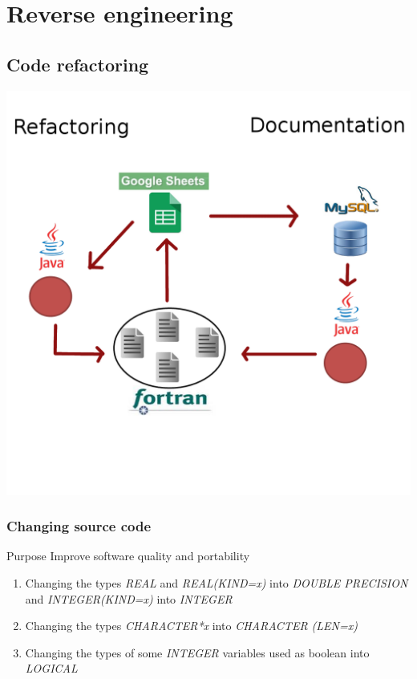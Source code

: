 \documentclass[10p]{beamer}
\begin{document}
\section{Reverse engineering}
\subsection{Code refactoring}
\begin{frame}
\includegraphics[scale=0.45]{Image/process.png}
\end{frame}
\begin{frame}
\frametitle{Changing source code}
\begin{block}{Purpose}
Improve software quality and portability
\end{block}
\begin{enumerate}
\item Changing the types \textit{REAL} and \textit{REAL(KIND=x)} into \textit{DOUBLE PRECISION} and \textit{INTEGER(KIND=x)} into \textit{INTEGER}
\item Changing the types \textit{CHARACTER*x} into \textit{CHARACTER (LEN=x)}
\item Changing the types of some \textit{INTEGER} variables used as boolean into \textit{LOGICAL}
\end{enumerate}
\end{frame}
\end{document}
